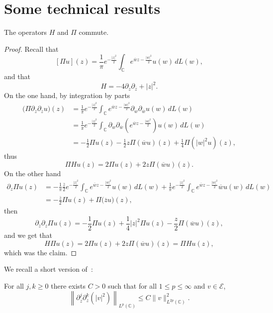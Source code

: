 \documentclass[AHL,Unicode,published]{cedram}
\newcommand{\C}{\mathbb{C}}
\newcommand{\E}{\mathcal{E}}
\newcommand{\ov}{\overline}
\newcommand{\<}{\langle}
\renewcommand{\>}{\rangle}
\begin{document}
\section{Some technical results}



\begin{lemm}\label{lem-comm}
The operators $H$ and $\Pi$ commute.
\end{lemm}

\begin{proof}
Recall that
\[
[\Pi u](z) = \frac{1}{\pi} e^{-\frac{|z|^2}{2}} \int_\C e^{\ov w z - \frac{|w|^2}{2}} u(w) \,dL(w),
\]
and that
\[
H=-4\partial_z \partial_{\ov z}+|z|^2.
\]
On the one hand, by integration by parts
\begin{align*}
\big(\Pi \partial_z\partial_{\ov z} u\big)(z)&= \frac{1}{\pi} e^{-\frac{|z|^2}{2}} \int_\C e^{\ov w z - \frac{|w|^2}{2}} \partial_w\partial_{\ov w} u(w) \,dL(w)\\
&= \frac{1}{\pi} e^{-\frac{|z|^2}{2}} \int_\C \partial_w\partial_{\ov w} \left(e^{\ov w z - \frac{|w|^2}{2}}\right) u(w) \,dL(w)\\
&= -\frac12 \Pi u(z)-\frac12 z \Pi(\ov{w}u)(z)+\frac14 \Pi\left(|w|^2u\right)(z),
\end{align*}
thus
\[
\Pi Hu(z)=2\Pi u(z)+2z \Pi(\ov{w}u)(z).
\]
On the other hand
\begin{align*}
\partial_z \Pi u(z) &=- \frac{1}{\pi}\frac{\ov{z}}2 e^{-\frac{|z|^2}{2}} \int_\C e^{\ov w z - \frac{|w|^2}{2}} u(w) \,dL(w)+ \frac{1}{\pi} e^{-\frac{|z|^2}{2}} \int_\C e^{\ov w z - \frac{|w|^2}{2}} \ov{w}u(w) \,dL(w)\\
&=-\frac{\ov{z}}{2}\Pi u(z)+\Pi\big(\ov{z}u\big)(z),
\end{align*}
then
\[
\partial_{\ov z}\partial_z \Pi u(z)=-\frac{1}2 \Pi u(z)+ \frac14 |z|^2 \Pi u(z)-\frac{z}2\Pi(\ov{w}u)(z),
\]
and we get that
\[
H \Pi u(z)=2\Pi u(z)+2z \Pi(\ov{w}u)(z) =\Pi Hu(z),
\]
which was the claim.
\end{proof}


We recall a short version of~\cite[Lemma~A.2]{Schw-Tho}:
\begin{lemm}\label{lem.deri}
For all $ j, k \geq 0$ there exists $C>0$ such that for all $1\leq p \leq \infty$ and $v\in \E$,
\[
\left\| \partial^j_{\ov z}\partial^k_z\left(|v|^2\right)\right\|_{L^p(\C)} \leq C \| v\|^2_{L^{2p}(\C)}.
\]
\end{lemm}

\vspace{15pt}


\end{document}
